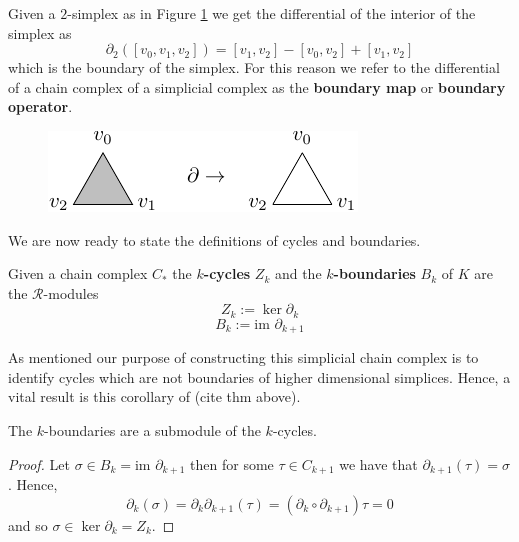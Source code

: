 \begin{example}
Given a $2$-simplex as in Figure \ref{2simplex} we get the differential of the interior of the simplex as \[\partial_{2}([v_{0},v_{1},v_{2}])=[v_{1},v_{2}]-[v_{0},v_{2}]+[v_{1},v_{2}]\] which is the boundary of the simplex. For this reason we refer to the differential of a chain complex of a simplicial complex as the \textbf{boundary map} or \textbf{boundary operator}.
\begin{figure}[ht]
  \centering
  \includegraphics[scale=2]{partialtri.pdf}
  \caption{\label{2simplex} }
\end{figure}
\end{example}
We are now ready to state the definitions of cycles and boundaries.
\begin{definition}
  Given a chain complex $C_{*}$ the \textbf{$k$-cycles} $Z_{k}$  and the \textbf{$k$-boundaries} $B_{k}$ of $K$ are the $\mathcal{R}$-modules
  \[ Z_{k} := \ker \partial_{k}\]
  \[ B_{k} := \textrm{im } \partial_{k+1}\]
\end{definition}
As mentioned our purpose of constructing this simplicial chain complex is to identify cycles which are not boundaries of higher dimensional simplices. Hence, a vital result is this corollary of (cite thm above).

\begin{corollary}
  The $k$-boundaries are a submodule of the $k$-cycles.
\end{corollary}


\begin{proof}
Let $\sigma \in B_{k} = \textrm{im } \partial_{k+1}$ then for some $\tau \in C_{k+1}$ we have that $\partial_{k+1}(\tau)=\sigma$. Hence,
\[ \partial_{k}(\sigma) = \partial_{k} \partial_{k+1}(\tau) = (\partial_{k} \circ \partial_{k+1}) \tau = 0\]
and so $\sigma \in \ker \partial_{k} = Z_{k}$.
\end{proof}

